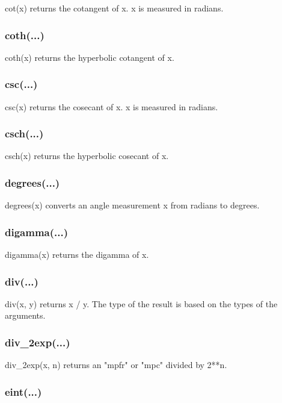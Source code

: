 cot(x) returns the cotangent of x. x is measured in radians.

\subsubsection{coth(...)}

coth(x) returns the hyperbolic cotangent of x.

\subsubsection{csc(...)}

csc(x) returns the cosecant of x. x is measured in radians.

\subsubsection{csch(...)}

csch(x) returns the hyperbolic cosecant of x.

\subsubsection{degrees(...)}

degrees(x) converts an angle measurement x from radians to degrees.

\subsubsection{digamma(...)}

digamma(x) returns the digamma of x.

\subsubsection{div(...)}

div(x, y) returns x / y. The type of the result is based on the types of the arguments.

\subsubsection{div\_2exp(...)}

div\_2exp(x, n) returns an "mpfr" or "mpc" divided by 2**n.

\subsubsection{eint(...)}

